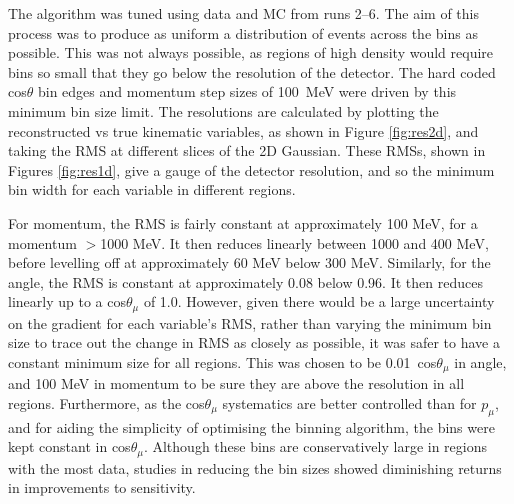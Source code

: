 The algorithm was tuned using data and MC from runs 2--6. The aim of this process was to produce as uniform a distribution of events across the bins as possible. This was not always possible, as regions of high density would require bins so small that they go below the resolution of the detector. The hard coded cos$\theta$ bin edges and momentum step sizes of 100~MeV were driven by this minimum bin size limit. The resolutions are calculated by plotting the reconstructed vs true kinematic variables, as shown in Figure \ref{fig:res2d}, and taking the RMS at different slices of the 2D Gaussian. These RMSs, shown in Figures \ref{fig:res1d}, give a gauge of the detector resolution, and so the minimum bin width for each variable in different regions.

For momentum, the RMS is fairly constant at approximately 100 MeV, for a momentum $>$1000 MeV. It then reduces linearly between 1000 and 400 MeV, before levelling off at approximately 60 MeV below 300 MeV. Similarly, for the angle, the RMS is constant at approximately 0.08 below 0.96. It then reduces linearly up to a cos$\theta_{\mu}$ of 1.0. However, given there would be a large uncertainty on the gradient for each variable's RMS, rather than varying the minimum bin size to trace out the change in RMS as closely as possible, it was safer to have a constant minimum size for all regions. This was chosen to be 0.01~cos$\theta_{\mu}$ in angle, and 100 MeV in momentum to be sure they are above the resolution in all regions. Furthermore, as the cos$\theta_{\mu}$ systematics are better controlled than for $p_{\mu}$, and for aiding the simplicity of optimising the binning algorithm, the bins were kept constant in cos$\theta_{\mu}$. Although these bins are conservatively large in regions with the most data, studies in reducing the bin sizes showed diminishing returns in improvements to sensitivity.


